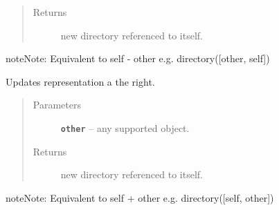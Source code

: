 \documentclass[letterpaper,10pt,english]{sphinxmanual}
\begin{document}
\begin{fulllineitems}
\begin{fulllineitems}
\begin{quote}
\begin{description}
\item[{Returns}] \leavevmode
new directory referenced to itself.

\end{description}\end{quote}

\begin{notice}{note}{Note:}
Equivalent to self - other e.g. directory({[}other, self{]})
\end{notice}

\end{fulllineitems}


\begin{fulllineitems}
\label{RRtoolbox.lib:RRtoolbox.lib.directory.Directory.update_right}
Updates representation a the right.
\begin{quote}\begin{description}
\item[{Parameters}] \leavevmode
\textbf{\texttt{other}} -- any supported object.

\item[{Returns}] \leavevmode
new directory referenced to itself.

\end{description}\end{quote}

\begin{notice}{note}{Note:}
Equivalent to self + other e.g. directory({[}self, other{]})
\end{notice}

\end{fulllineitems}


\end{fulllineitems}

\end{document}
